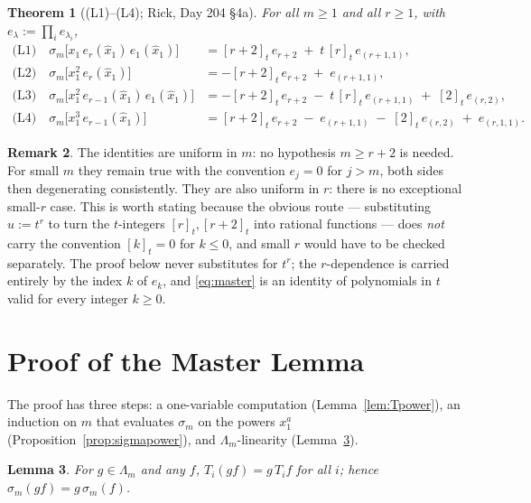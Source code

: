 \documentclass[11pt]{article}
\theoremstyle{plain}
\newtheorem{theorem}{Theorem}
\newtheorem{lemma}[theorem]{Lemma}
\theoremstyle{definition}
\newtheorem{remark}[theorem]{Remark}
\newcommand{\qt}[1]{[#1]_t}
\newcommand{\hx}{\widehat{x}}
\newcommand{\Lm}{\Lambda_m}
\newcommand{\sm}{\sigma_m}
\begin{document}
\begin{theorem}[(L1)--(L4); Rick, Day 204 \S4a]\label{thm:L}
For all $m\ge1$ and all $r\ge1$, with $e_\lambda:=\prod_i e_{\lambda_i}$,
\begin{align}
\text{(L1)}\quad \sm\bigl[x_1\,e_r(\hx_1)\,e_1(\hx_1)\bigr]
   &= \qt{r+2}\,e_{r+2} \;+\; t\,\qt{r}\,e_{(r+1,1)},\\
\text{(L2)}\quad \sm\bigl[x_1^2\,e_r(\hx_1)\bigr]
   &= -\qt{r+2}\,e_{r+2} \;+\; e_{(r+1,1)},\\
\text{(L3)}\quad \sm\bigl[x_1^2\,e_{r-1}(\hx_1)\,e_1(\hx_1)\bigr]
   &= -\qt{r+2}\,e_{r+2} \;-\; t\,\qt{r}\,e_{(r+1,1)} \;+\; \qt{2}\,e_{(r,2)},\\
\text{(L4)}\quad \sm\bigl[x_1^3\,e_{r-1}(\hx_1)\bigr]
   &= \qt{r+2}\,e_{r+2} \;-\; e_{(r+1,1)} \;-\; \qt{2}\,e_{(r,2)} \;+\; e_{(r,1,1)} .
\end{align}
\end{theorem}

\begin{remark}
The identities are uniform in $m$: no hypothesis $m\ge r+2$ is needed. For small $m$ they remain
true with the convention $e_j=0$ for $j>m$, both sides then degenerating consistently.
They are also uniform in $r$: there is no exceptional small-$r$ case. This is worth stating
because the obvious route --- substituting $u:=t^{r}$ to turn the $t$-integers
$\qt{r},\qt{r+2}$ into rational functions --- does \emph{not} carry the convention
$\qt{k}=0$ for $k\le0$, and small $r$ would have to be checked separately. The proof below
never substitutes for $t^r$; the $r$-dependence is carried entirely by the index $k$ of
$e_k$, and \eqref{eq:master} is an identity of polynomials in $t$ valid for every integer $k\ge0$.
\end{remark}

\section{Proof of the Master Lemma}

The proof has three steps: a one-variable computation (Lemma~\ref{lem:Tpower}), an induction
on $m$ that evaluates $\sm$ on the powers $x_1^a$ (Proposition~\ref{prop:sigmapower}), and
$\Lm$-linearity (Lemma~\ref{lem:linear}).

\begin{lemma}\label{lem:linear}
For $g\in\Lm$ and any $f$, $T_i(gf)=g\,T_i f$ for all $i$; hence $\sm(gf)=g\,\sm(f)$.
\end{lemma}
\end{document}

